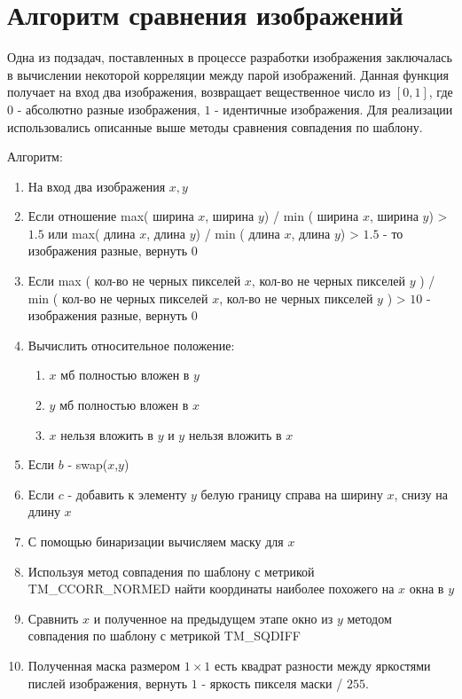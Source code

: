 \documentclass[oneside,final,14pt]{extreport}
\begin{document}
\section{Алгоритм сравнения изображений}
Одна из подзадач, поставленных в процессе разработки изображения заключалась в вычислении некоторой корреляции между парой изображений. Данная функция получает на вход два изображения, возвращает вещественное число из $[0,1]$, где $0$ - абсолютно разные изображения, $1$ - идентичные изображения.  Для реализации использовались описанные выше методы сравнения совпадения по шаблону.

Алгоритм:

\begin{enumerate}
\item На вход два изображения $x, y$
\item Если отношение max( ширина $x$, ширина $y$) / min ( ширина $x$, ширина $y$) > $1.5$ или max( длина $x$, длина $y$) / min ( длина $x$, длина $y$) > $1.5$ - то изображения разные, вернуть $0$
\item Если  max ( кол-во не черных пикселей $x$,  кол-во не черных пикселей $y$ ) / min ( кол-во не черных пикселей $x$,  кол-во не черных пикселей $y$ ) > $10$ - изображения разные, вернуть $0$
\item Вычислить относительное положение: 

\begin{enumerate}
\item $x$ мб полностью  вложен в $y$
\item $y$ мб полностью вложен в $x$
\item $x$ нельзя вложить в $y$ и $y$ нельзя вложить в  $x$
\end{enumerate}

\item Если $b$ - swap($x$,$y$)
\item Если $c$ - добавить к элементу $y$ белую границу справа на ширину $x$, снизу на длину $x$
\item С помощью бинаризации вычисляем маску для $x$
\item Используя метод совпадения по шаблону с метрикой TM\_CCORR\_NORMED найти координаты наиболее похожего на $x$ окна в $y$
\item Сравнить $x$ и полученное на предыдущем этапе окно из $y$ методом совпадения по шаблону с метрикой TM\_SQDIFF
\item Полученная маска размером $1 \times 1$ есть квадрат разности между яркостями пислей изображения, вернуть $1$ - яркость пикселя маски / $255$.
\end{enumerate}
\end{document}
